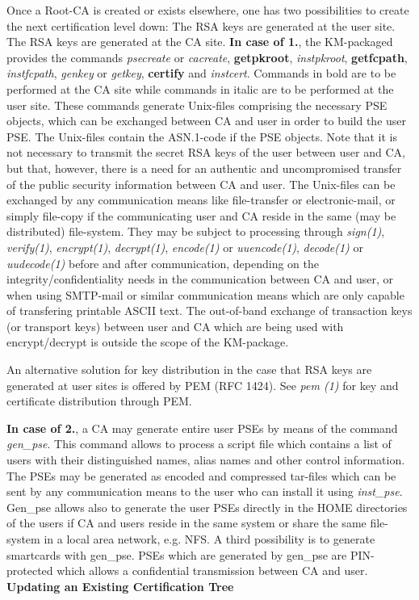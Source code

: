 Once a Root-CA is created or exists elsewhere, one has two possibilities
to create the next certification level down:
\be
\m The RSA keys are generated at the user site.
\m The RSA keys are generated at the CA site.
\ee
{\bf In case of 1.}, the KM-packaged provides the commands {\em psecreate} or
{\em cacreate}, {\bf getpkroot}, {\em instpkroot}, {\bf getfcpath}, {\em instfcpath},
{\em genkey} or {\em getkey}, {\bf certify} and {\em instcert}. Commands in bold are
to be performed at the CA site while commands in italic are to be performed at the user site.
These commands generate Unix-files comprising the necessary PSE objects, 
which can be exchanged between CA and user
in order to build the user PSE. The Unix-files contain the ASN.1-code
if the PSE objects. Note that it is not necessary to transmit the secret 
RSA keys of the user between user and CA, but that, however, there is a need for an
authentic and uncompromised transfer of the public security information
between CA and user. The Unix-files can be exchanged by any communication means like 
file-transfer or electronic-mail, or simply file-copy if the communicating user and CA 
reside in the same (may be distributed) file-system. They may be subject to processing 
through {\em sign(1)}, {\em verify(1)}, {\em encrypt(1)},
{\em decrypt(1)}, {\em encode(1)} or {\em uuencode(1)}, {\em decode(1)} or {\em uudecode(1)}
before and after communication, depending on the integrity/confidentiality needs in the
communication between CA and user, or when using SMTP-mail or similar communication means 
which are only capable of transfering printable ASCII text. The out-of-band exchange
of transaction keys (or transport keys) between user and CA which are being used
with encrypt/decrypt is outside the scope of the KM-package.

An alternative solution for key distribution in the case that RSA keys are generated
at user sites is offered by PEM (RFC 1424). See {\em pem (1)} for key and certificate
distribution through PEM. 

{\bf In case of 2.}, a CA may generate entire user PSEs by means of the command
{\em gen\_pse}. This command allows to process a script file which contains
a list of users with their distinguished names, alias names and other control
information. The PSEs may be generated as encoded and compressed tar-files which can
be sent by any communication means to the user who can install it using {\em inst\_pse}. 
Gen\_pse allows also to generate
the user PSEs directly in the HOME directories of the users if CA and users reside
in the same system or share the same file-system in a local area network, e.g. NFS.
A third possibility is to generate smartcards with gen\_pse. PSEs which are generated
by gen\_pse are PIN-protected which allows a confidential transmission between
CA and user. 
\\ [1em]
{\bf Updating an Existing Certification Tree}


